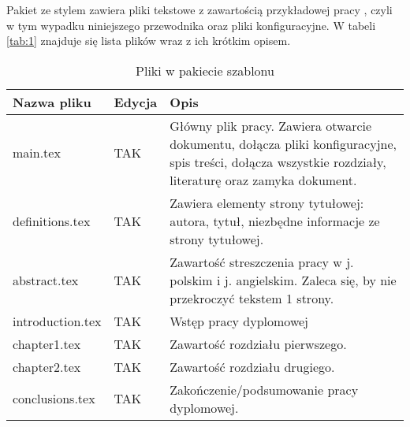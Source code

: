 Pakiet ze stylem zawiera pliki tekstowe z zawartością przykładowej pracy , czyli w tym wypadku niniejszego przewodnika oraz pliki konfiguracyjne. W tabeli \ref{tab:1} znajduje się lista plików wraz z ich krótkim opisem.

\begin{table}[h]
    \centering
    \caption{Pliki w pakiecie szablonu}
    \begin{tabular}{p{}|p{} | p{}}
        \toprule
        \textbf{Nazwa pliku} & \textbf{Edycja} & \textbf{Opis}                                                                                                                                                               \\
        \midrule
        main.tex             & TAK             & Główny plik pracy. Zawiera otwarcie dokumentu, dołącza pliki konfiguracyjne, spis treści, dołącza wszystkie rozdziały, literaturę oraz zamyka dokument.                     \\
        definitions.tex      & TAK             & Zawiera elementy strony tytułowej: autora, tytuł, niezbędne informacje ze strony tytułowej.                                                                                 \\
        abstract.tex         & TAK             & Zawartość streszczenia pracy w j. polskim i j. angielskim. Zaleca się, by nie przekroczyć tekstem 1 strony.                                                                 \\
        introduction.tex     & TAK             & Wstęp pracy dyplomowej                                                                                                                                                      \\
        chapter1.tex         & TAK             & Zawartość rozdziału pierwszego.                                                                                                                                             \\
        chapter2.tex         & TAK             & Zawartość rozdziału drugiego.                                                                                                                                               \\
        conclusions.tex      & TAK             & Zakończenie/podsumowanie pracy dyplomowej.                                                                                                                                  \\

\end{tabular}
\end{table}
